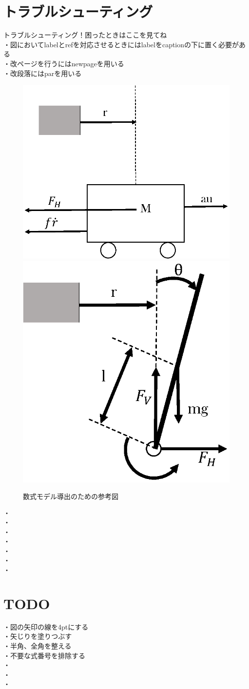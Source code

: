 \section{トラブルシューティング}
トラブルシューティング！困ったときはここを見てね\\
・図においてlabelとrefを対応させるときにはlabelをcaptionの下に置く必要がある\\
・改ページを行うにはnewpageを用いる\\
・改段落にはparを用いる\\
\begin{figure}[H]
		\centering
		\includegraphics[width=0.4\linewidth]{gazo/cart.eps}
		\includegraphics[width=0.4\linewidth]{gazo/stick.eps}
		\caption{数式モデル導出のための参考図}
		\label{image:test}
\end{figure}
・\\
・\\
・\\
・\\
・\\
・\\
・\\

\section{TODO}
・図の矢印の線を4ptにする\\
・矢じりを塗りつぶす\\
・半角、全角を整える\\
・不要な式番号を排除する\\
・\\
・\\
・\\